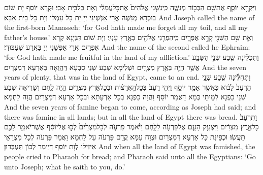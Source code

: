 {וַיִּקְרָ֥א יוֹסֵ֛ף אֶת\maqqaf שֵׁ֥ם הַבְּכ֖וֹר מְנַשֶּׁ֑ה כִּֽי\maqqaf נַשַּׁ֤נִי אֱלֹהִים֙ אֶת\maqqaf כׇּל\maqqaf עֲמָלִ֔י וְאֵ֖ת כׇּל\maqqaf בֵּ֥ית אָבִֽי׃}
{וּקְרָא יוֹסֵף יָת שׁוֹם בּוּכְרָא מְנַשֶּׁה אֲרֵי אַנְשְׁיַנִי יְיָ יָת כָּל עַמְלִי וְיָת כָּל בֵּית אַבָּא׃}
{And Joseph called the name of the first-born Manasseh: ‘for God hath made me forget all my toil, and all my father’s house.’}{}
{וְאֵ֛ת שֵׁ֥ם הַשֵּׁנִ֖י קָרָ֣א אֶפְרָ֑יִם כִּֽי\maqqaf הִפְרַ֥נִי אֱלֹהִ֖ים בְּאֶ֥רֶץ עׇנְיִֽי׃}
{וְיָת שׁוֹם תִּנְיָנָא קְרָא אֶפְרָיִם אֲרֵי אַפְּשַׁנִי יְיָ בַּאֲרַע שִׁעְבּוּדִי׃}
{And the name of the second called he Ephraim: ‘for God hath made me fruitful in the land of my affliction.’}{}
{וַתִּכְלֶ֕ינָה שֶׁ֖בַע שְׁנֵ֣י הַשָּׂבָ֑ע אֲשֶׁ֥ר הָיָ֖ה בְּאֶ֥רֶץ מִצְרָֽיִם׃}
{וּשְׁלִימָא שְׁבַע שְׁנֵי סִבְעָא דַּהֲוַאָה בְּאַרְעָא דְּמִצְרָיִם׃}
{And the seven years of plenty, that was in the land of Egypt, came to an end.}{}
{וַתְּחִלֶּ֜ינָה שֶׁ֣בַע שְׁנֵ֤י הָרָעָב֙ לָב֔וֹא כַּאֲשֶׁ֖ר אָמַ֣ר יוֹסֵ֑ף וַיְהִ֤י רָעָב֙ בְּכׇל\maqqaf הָ֣אֲרָצ֔וֹת וּבְכׇל\maqqaf אֶ֥רֶץ מִצְרַ֖יִם הָ֥יָה לָֽחֶם׃}
{וְשָׁרִיאָה שְׁבַע שְׁנֵי כַפְנָא לְמֵיתֵי כְּמָא דַּאֲמַר יוֹסֵף וַהֲוָה כַפְנָא בְּכָל אַרְעָתָא וּבְכָל אַרְעָא דְּמִצְרַיִם הֲוָה לַחְמָא׃}
{And the seven years of famine began to come, according as Joseph had said; and there was famine in all lands; but in all the land of Egypt there was bread.}{}
{וַתִּרְעַב֙ כׇּל\maqqaf אֶ֣רֶץ מִצְרַ֔יִם וַיִּצְעַ֥ק הָעָ֛ם אֶל\maqqaf פַּרְעֹ֖ה לַלָּ֑חֶם וַיֹּ֨אמֶר פַּרְעֹ֤ה לְכׇל\maqqaf מִצְרַ֙יִם֙ לְכ֣וּ אֶל\maqqaf יוֹסֵ֔ף אֲשֶׁר\maqqaf יֹאמַ֥ר לָכֶ֖ם תַּעֲשֽׂוּ׃}
{וּכְפֵינַת כָּל אַרְעָא דְּמִצְרַיִם וּצְוַח עַמָּא קֳדָם פַּרְעֹה עַל לַחְמָא וַאֲמַר פַּרְעֹה לְכָל מִצְרָאֵי אִיזִילוּ לְוָת יוֹסֵף דְּיֵימַר לְכוֹן תַּעְבְּדוּן׃}
{And when all the land of Egypt was famished, the people cried to Pharaoh for bread; and Pharaoh said unto all the Egyptians: ‘Go unto Joseph; what he saith to you, do.’}{}
